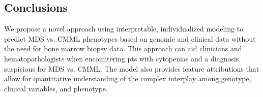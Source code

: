 \subsection{Conclusions}%

We propose a novel approach using interpretable, individualized modeling to predict MDS vs. CMML phenotypes based on genomic and clinical data without the need for bone marrow biopsy data. This approach can aid clinicians and hematopathologists when encountering pts with cytopenias and a diagnosis suspicious for MDS vs. CMML. The model also provides feature attributions that allow for quantitative understanding of the complex interplay among genotype, clinical variables, and phenotype.


